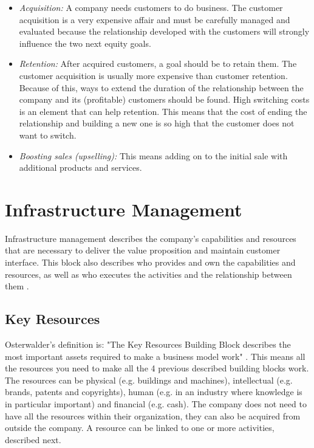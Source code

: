 \begin{itemize}
\renewcommand{\labelitemi}{$\bullet$}
\item \emph{Acquisition:} A company needs customers to do business. The customer acquisition is a very expensive affair and must be carefully managed and evaluated because the relationship developed with the customers will strongly influence the two next equity goals.
\item \emph{Retention:} After acquired customers, a goal should be to retain them. The customer acquisition is usually more expensive than customer retention. Because of this, ways to extend the duration of the relationship between the company and its (profitable) customers should be found. High switching costs is an element that can help retention. This means that the cost of ending the relationship and building a new one is so high that the customer does not want to switch.
\item \emph{Boosting sales (upselling):} This means adding on to the initial sale with additional products and services.
\end{itemize}

\section{Infrastructure Management}
Infrastructure management describes the company's capabilities and resources that are necessary to deliver the value proposition and maintain customer interface. This block also describes who provides and own the capabilities and resources, as well as who executes the activities and the relationship between them \cite{osterwalderthesis}.

\subsection{Key Resources}
Osterwalder's definition is: "The Key Resources Building Block describes the most important assets required to make a business model work" \cite{osterwalder}. This means all the resources you need to make all the 4 previous described building blocks work. The resources can be physical (e.g. buildings and machines), intellectual (e.g. brands, patents and copyrights), human (e.g. in an industry where knowledge is in particular important) and financial (e.g. cash). The company does not need to have all the resources within their organization, they can also be acquired from outside the company. A resource can be linked to one or more activities, described next.

